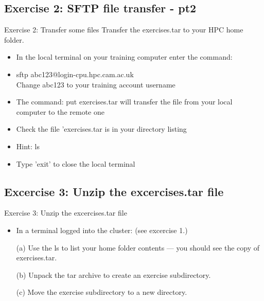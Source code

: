 \documentclass[handout]{beamer} %
\begin{document}
\subsection{Exercise 2: SFTP file transfer - pt2}
\begin{frame}{Exercise 2: Transfer some files}
Transfer the exercises.tar to your HPC home folder.
\begin{itemize}
\item{In the local terminal on your training computer enter the command:}
\item \alert{\footnotesize sftp abc123@login-cpu.hpc.cam.ac.uk}\\
Change abc123 to your training account username
\item{The command: \alert{\footnotesize put exercises.tar} will transfer the file from your local computer to the remote one}
\item{Check the file 'exercises.tar is in your directory listing}
\item{Hint: ls}
\item Type 'exit' to close the local terminal
\end{itemize}
\end{frame}

\subsection{Excercise 3: Unzip the excercises.tar file}
\begin{frame}{Exercise 3: Unzip the excercises.tar file}
  \begin{itemize}
\item{In a terminal logged into the cluster: (see excercise 1.)}
\item[(a)]{Use the \alert{ls} to list your home folder contents --- you should see the copy of exercises.tar.}

\item[(b)]{Unpack the tar archive to create an exercise subdirectory.}
\item[(c)]{Move the exercise subdirectory to a new directory.}
\end{itemize}
\end{frame}
\end{document}
